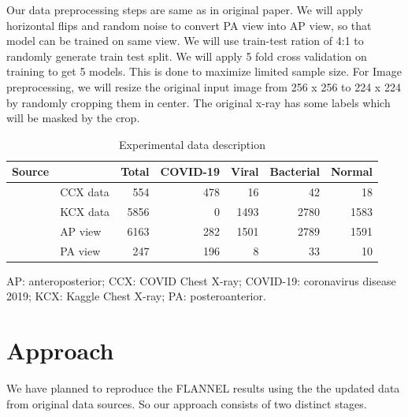 \documentclass{sigkddExp}
\begin{document}
Our data preprocessing steps are same as in original paper. We will apply
horizontal flips and random noise to convert PA view into AP view, so that model
can be trained on same view. We will use train-test ration of 4:1 to randomly
generate train test split. We will apply 5 fold cross validation on training to
get 5 models. This is done to maximize limited sample size. For Image
preprocessing, we will resize the original input image from 256 x 256 to 224 x
224 by randomly cropping them in center. The original x-ray has some labels
which will be masked by the crop.

\begin{table}
    \centering
    \caption{Experimental data description}
    \label{table:datastats}
    \begin{tabular}{llrrrrr} \hline
        Source                              &          & Total & COVID-19 & Viral & Bacterial & Normal \\ \hline
        \multirow{2}{*}{} Original data     & CCX data & 554   & 478      & 16    & 42        & 18     \\
                                            & KCX data & 5856  & 0        & 1493  & 2780      & 1583   \\ \hline
        \multirow{2}{*}{} View Distribution & AP view  & 6163  & 282      & 1501  & 2789      & 1591   \\
                                            & PA view  & 247   & 196      & 8     & 33        & 10     \\ \hline
    \end{tabular}\par
    \bigskip
    AP: anteroposterior; CCX: COVID Chest X-ray; COVID-19: coronavirus disease 2019;
    KCX: Kaggle Chest X-ray; PA: posteroanterior.
\end{table}


\section{Approach}

We have planned to reproduce the FLANNEL results using the the updated data
from original data sources. So our approach consists of two distinct stages.
\end{document}
